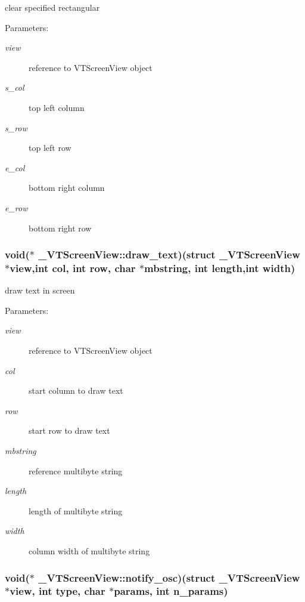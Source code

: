 clear specified rectangular

\begin{Desc}
\item[Parameters:]
\begin{description}
\item[{\em view}]reference to VTScreen\-View object \item[{\em s\_\-col}]top left column \item[{\em s\_\-row}]top left row \item[{\em e\_\-col}]bottom right column \item[{\em e\_\-row}]bottom right row \end{description}
\end{Desc}
\subsubsection{\setlength{\rightskip}{0pt plus 5cm}void($\ast$ \_\-VTScreen\-View::draw\_\-text)(struct \_\-VTScreen\-View $\ast$view,int col, int row, char $\ast$mbstring, int length,int width)}\label{struct__VTScreenView_m1}


draw text in screen

\begin{Desc}
\item[Parameters:]
\begin{description}
\item[{\em view}]reference to VTScreen\-View object \item[{\em col}]start column to draw text \item[{\em row}]start row to draw text \item[{\em mbstring}]reference multibyte string \item[{\em length}]length of multibyte string \item[{\em width}]column width of multibyte string \end{description}
\end{Desc}
\subsubsection{\setlength{\rightskip}{0pt plus 5cm}void($\ast$ \_\-VTScreen\-View::notify\_\-osc)(struct \_\-VTScreen\-View $\ast$view, int type, char $\ast$params, int n\_\-params)}\label{struct__VTScreenView_m8}


